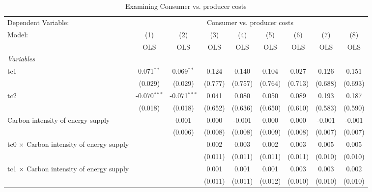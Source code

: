 
\begin{table}[htbp]
   \caption{Examining Consumer vs. producer costs}
   \centering
   \begin{tabular}{lcccccccc}
      \toprule
      Dependent Variable: & \multicolumn{8}{c}{Consumer vs. producer costs}\\
      Model:                                          & (1)            & (2)            & (3)     & (4)     & (5)     & (6)     & (7)     & (8)\\  
                                                      &  OLS           & OLS            & OLS     & OLS     & OLS     & OLS     & OLS     & OLS\\  
      \midrule
      \emph{Variables}\\
      tc1                                             & 0.071$^{**}$   & 0.069$^{**}$   & 0.124   & 0.140   & 0.104   & 0.027   & 0.126   & 0.151\\   
                                                      & (0.029)        & (0.029)        & (0.777) & (0.757) & (0.764) & (0.713) & (0.688) & (0.693)\\   
      tc2                                             & -0.070$^{***}$ & -0.071$^{***}$ & 0.041   & 0.080   & 0.050   & 0.089   & 0.193   & 0.187\\   
                                                      & (0.018)        & (0.018)        & (0.652) & (0.636) & (0.650) & (0.610) & (0.583) & (0.590)\\   
      Carbon intensity of energy supply               &                & 0.001          & 0.000   & -0.001  & 0.000   & 0.000   & -0.001  & -0.001\\   
                                                      &                & (0.006)        & (0.008) & (0.008) & (0.009) & (0.008) & (0.007) & (0.007)\\   
      tc0 $\times$ Carbon intensity of energy supply  &                &                & 0.002   & 0.003   & 0.002   & 0.003   & 0.005   & 0.005\\   
                                                      &                &                & (0.011) & (0.011) & (0.011) & (0.011) & (0.010) & (0.010)\\   
      tc1 $\times$ Carbon intensity of energy supply  &                &                & 0.001   & 0.001   & 0.001   & 0.003   & 0.003   & 0.002\\   
                                                      &                &                & (0.011) & (0.011) & (0.012) & (0.010) & (0.010) & (0.010)\\   

\end{tabular}
\end{table}
